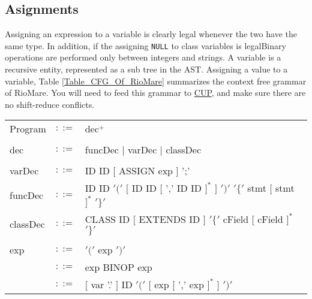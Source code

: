 \documentclass{article}
\begin{document}
\subsection{Asignments}
Assigning an expression to a variable is clearly legal whenever the two have the same type.
In addition, if the assigning \verb"NULL" to class variables is legalBinary operations are performed only between integers and strings.
A variable is a recursive entity, represented as a sub tree in the AST.
Assigning a value to a variable, 
Table \ref{Table_CFG_Of_RioMare} summarizes the context free grammar of RioMare.
You will need to feed this grammar to \href{http://www2.cs.tum.edu/projects/cup/}{CUP},
and make sure there are no shift-reduce conflicts.  
\begin{table}[h]
\centering
\begin{tabular}{ l c l }
Program  & $::=$ & dec$^{+}$ \\
\\
dec      & $::=$ & funcDec $|$ varDec $|$ classDec \\
\\
varDec   & $::=$ & ID ID $[$ ASSIGN exp $]$ ';' \\
funcDec  & $::=$ & ID ID $'('$ $[$ ID ID $[$ ',' ID ID $]^{*}$ $]$ $')'$ %
                   $'\{'$ stmt   $[$ stmt $]^{*}$ $'\}'$                 \\
classDec & $::=$ & CLASS ID $[$ EXTENDS ID $]$ $'\{'$ cField $[$ cField $]^{*}$ $'\}'$ \\
\\
exp      & $::=$ & $'('$ exp $')'$                                                \\
         & $::=$ & exp BINOP exp                                                  \\
         & $::=$ & $[$ var '.' $]$ ID $'('$ $[$ exp $[$ ',' exp $]^{*}$ $]$ $')'$ \\

\end{tabular}
\end{table}
\end{document}
